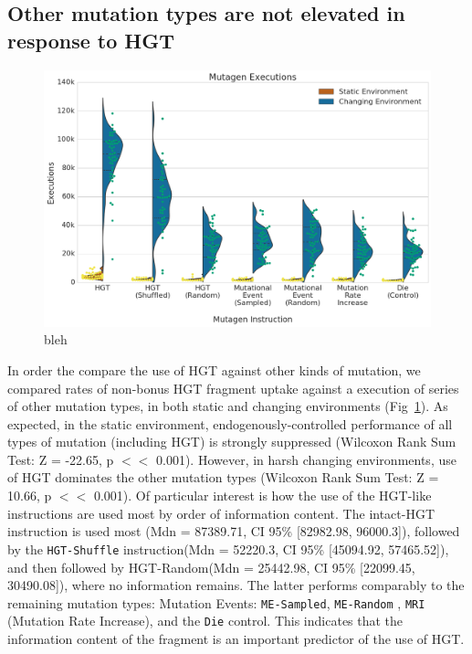 \documentclass[PhD]{msu-thesis}
\begin{document}
\subsection{Other mutation types are not elevated in response to HGT}
\begin{figure}[h!]
\begin{center}
\includegraphics[width=0.7\columnwidth]{figures/HGT/mutagen_execution.png}
\caption{bleh
}\label{fig:mutagen_execution}
\end{center}
\end{figure}
In order the compare the use of HGT against other kinds of mutation, we compared rates of non-bonus HGT fragment uptake against a execution of series of other mutation types, in both static and changing environments (Fig~\ref{fig:mutagen_execution}). As expected, in the static environment, endogenously-controlled performance of all types of mutation (including HGT) is strongly suppressed (Wilcoxon Rank Sum Test: Z = -22.65, p $<<$ 0.001). However, in harsh changing environments, use of HGT dominates the other mutation types (Wilcoxon Rank Sum Test: Z = 10.66, p $<<$ 0.001). Of particular interest is how the use of the HGT-like instructions are used most by order of information content. The intact-HGT instruction is used most (Mdn = 87389.71, CI 95\% [82982.98, 96000.3]), followed by the \texttt{HGT-Shuffle} instruction(Mdn = 52220.3, CI 95\% [45094.92, 57465.52]), and then followed by {HGT-Random}(Mdn = 25442.98, CI 95\% [22099.45, 30490.08]), where no information remains.
The latter performs comparably to the remaining mutation types: Mutation Events: \texttt{ME-Sampled}, \texttt{ME-Random}
, \texttt{MRI} (Mutation Rate Increase), and the \texttt{Die} control. This indicates that the information content of the fragment is an important predictor of the use of HGT. 
\end{document}
